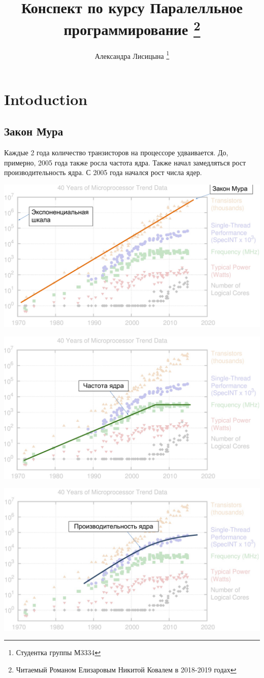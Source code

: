 \documentclass[10pt,a4paper,oneside,titlepage]{article}
\title{Конспект по курсу Паралелльное программирование \thanks{Читаемый Романом Елизаровым  Никитой Ковалем в 2018-2019 годах}}
\author{Александра Лисицына \thanks{Студентка группы М3334}}
\theoremstyle{plain}
\theoremstyle{defenition}
\begin{document}
	
\maketitle

\tableofcontents

\clearpage	
\section{Intoduction}
\subsection{Закон Мура}
Каждые 2 года количество транзисторов на процессоре удваивается.
До, примерно, 2005 года также росла частота ядра. Также начал замедляться рост производительность ядра. С 2005 года начался рост числа ядер.

\includegraphics*[scale=0.5]{Mura1}

\includegraphics*[scale=0.5]{Mura2}

\includegraphics*[scale=0.5]{Mura3}
\end{document}
